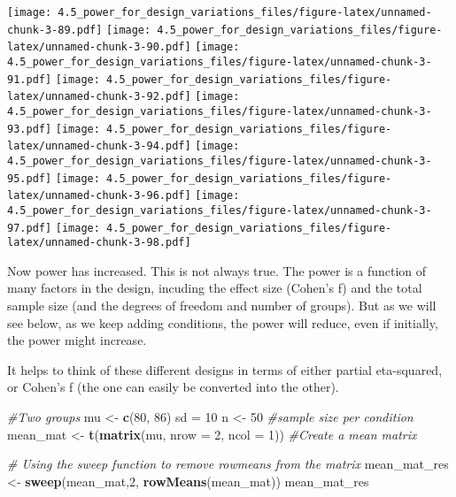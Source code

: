 \documentclass[]{article}
\newenvironment{Shaded}{\begin{snugshade}}{\end{snugshade}}
\newcommand{\KeywordTok}[1]{\textcolor[rgb]{0.13,0.29,0.53}{\textbf{#1}}}
\newcommand{\DataTypeTok}[1]{\textcolor[rgb]{0.13,0.29,0.53}{#1}}
\newcommand{\DecValTok}[1]{\textcolor[rgb]{0.00,0.00,0.81}{#1}}
\newcommand{\StringTok}[1]{\textcolor[rgb]{0.31,0.60,0.02}{#1}}
\newcommand{\CommentTok}[1]{\textcolor[rgb]{0.56,0.35,0.01}{\textit{#1}}}
\newcommand{\NormalTok}[1]{#1}
\begin{document}
\texttt{[image: 4.5\_power\_for\_design\_variations\_files/figure-latex/unnamed-chunk-3-89.pdf]}
\texttt{[image: 4.5\_power\_for\_design\_variations\_files/figure-latex/unnamed-chunk-3-90.pdf]}
\texttt{[image: 4.5\_power\_for\_design\_variations\_files/figure-latex/unnamed-chunk-3-91.pdf]}
\texttt{[image: 4.5\_power\_for\_design\_variations\_files/figure-latex/unnamed-chunk-3-92.pdf]}
\texttt{[image: 4.5\_power\_for\_design\_variations\_files/figure-latex/unnamed-chunk-3-93.pdf]}
\texttt{[image: 4.5\_power\_for\_design\_variations\_files/figure-latex/unnamed-chunk-3-94.pdf]}
\texttt{[image: 4.5\_power\_for\_design\_variations\_files/figure-latex/unnamed-chunk-3-95.pdf]}
\texttt{[image: 4.5\_power\_for\_design\_variations\_files/figure-latex/unnamed-chunk-3-96.pdf]}
\texttt{[image: 4.5\_power\_for\_design\_variations\_files/figure-latex/unnamed-chunk-3-97.pdf]}
\texttt{[image: 4.5\_power\_for\_design\_variations\_files/figure-latex/unnamed-chunk-3-98.pdf]}

Now power has increased. This is not always true. The power is a
function of many factors in the design, incuding the effect size
(Cohen's f) and the total sample size (and the degrees of freedom and
number of groups). But as we will see below, as we keep adding
conditions, the power will reduce, even if initially, the power might
increase.

It helps to think of these different designs in terms of either partial
eta-squared, or Cohen's f (the one can easily be converted into the
other).

\begin{Shaded}
\begin{Highlighting}[]
\CommentTok{#Two groups}
\NormalTok{mu <-}\StringTok{ }\KeywordTok{c}\NormalTok{(}\DecValTok{80}\NormalTok{, }\DecValTok{86}\NormalTok{)}
\NormalTok{sd =}\StringTok{ }\DecValTok{10}
\NormalTok{n <-}\StringTok{ }\DecValTok{50} \CommentTok{#sample size per condition}
\NormalTok{mean_mat <-}\StringTok{ }\KeywordTok{t}\NormalTok{(}\KeywordTok{matrix}\NormalTok{(mu, }
                     \DataTypeTok{nrow =} \DecValTok{2}\NormalTok{,}
                     \DataTypeTok{ncol =} \DecValTok{1}\NormalTok{)) }\CommentTok{#Create a mean matrix}

\CommentTok{# Using the sweep function to remove rowmeans from the matrix}
\NormalTok{mean_mat_res <-}\StringTok{ }\KeywordTok{sweep}\NormalTok{(mean_mat,}\DecValTok{2}\NormalTok{, }\KeywordTok{rowMeans}\NormalTok{(mean_mat))   }
\NormalTok{mean_mat_res}
\end{Highlighting}
\end{Shaded}
\end{document}
